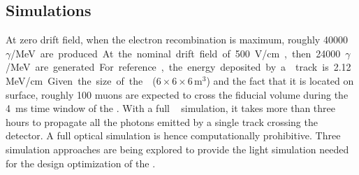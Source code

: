 \subsection{Simulations}
\label{sec:fddp-pd-6.1}

At zero drift field, when the electron recombination is maximum, roughly \SI{40000}{$\gamma$/MeV} are produced. At the nominal drift field of \SI{500}{V/cm}, then \num{24000}{$\gamma$/MeV} are generated. For reference, the energy deposited by a  track is \SI{2.12}{MeV/cm}. Given the size of the  ($6\times6\times6$\,m$^3$) and the fact that it is located on surface, roughly \num{100} muons are expected to cross the fiducial volume during the \SI{4}{ms} time window of the . With a full ~\cite{geant4} simulation, it takes more than three hours to propagate all the photons emitted by a single  track crossing the  detector. A full optical simulation is hence computationally prohibitive. Three simulation approaches are being explored to provide the light simulation needed for the design optimization of the . %


